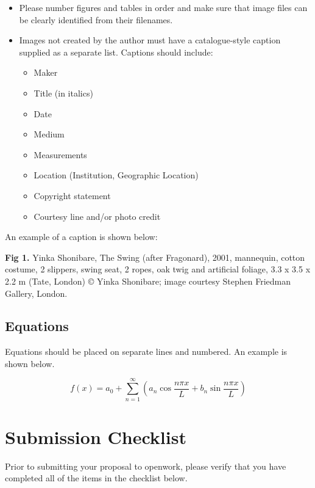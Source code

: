 \documentclass[12pt]{article}
\begin{document}
\begin{itemize}[noitemsep]
    \item Please number figures and tables in order and make sure that image files can be clearly identified from their filenames.
    \item Images not created by the author must have a catalogue-style caption supplied as a separate list. Captions should include:
    \begin{itemize}[noitemsep]
        \item [$\circ$] Maker
        \item [$\circ$] Title (in italics)
        \item [$\circ$] Date
        \item [$\circ$] Medium
        \item [$\circ$] Measurements
        \item [$\circ$] Location (Institution, Geographic Location)
        \item [$\circ$] Copyright statement
        \item [$\circ$] Courtesy line and/or photo credit
    \end{itemize}
\end{itemize}

An example of a caption is shown below: 

\textbf{Fig 1.} Yinka Shonibare, The Swing (after Fragonard), 2001, mannequin, cotton costume, 2 slippers, swing seat, 2 ropes, oak twig and artificial foliage, 3.3 x 3.5 x 2.2 m (Tate, London) © Yinka Shonibare; image courtesy Stephen Friedman Gallery, London.

\subsection{Equations}

Equations should be placed on separate lines and numbered. An example is shown below.

\begin{equation}
f(x) = a_0 + \sum_{n=1}^{\infty} \left( a_n \cos\frac{n\pi x}{L} + b_n \sin\frac{n\pi x}{L} \right)
\end{equation}

\section{Submission Checklist}

Prior to submitting your proposal to openwork, please verify that you have completed all of the items in the checklist below.
\end{document}
